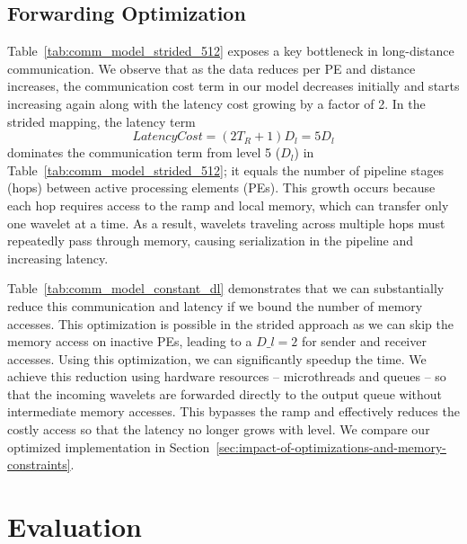 \documentclass[conference]{IEEEtran}
\begin{document}
        \subsection{Forwarding Optimization} \label{sec:forwarding}
            Table~\ref{tab:comm_model_strided_512} exposes a key bottleneck in long-distance communication.  We observe that as the data reduces per PE and distance increases, the communication cost term in our model decreases initially and starts increasing again along with the latency cost growing by a factor of 2.
            In the strided mapping, the latency term
            \begin{equation}\label{equation:latency}
                LatencyCost = (2T_R + 1)D_l = 5D_l
            \end{equation}
            dominates the communication term from level 5 (\(D_l\)) in Table~\ref{tab:comm_model_strided_512}; it equals the number of pipeline stages (hops) between active processing elements (PEs). This growth occurs because each hop requires access to the ramp and local memory, which can transfer only one wavelet at a time. As a result, wavelets traveling across multiple hops must repeatedly pass through memory, causing serialization in the pipeline and increasing latency.

            Table~\ref{tab:comm_model_constant_dl} demonstrates
            that we can substantially reduce this communication and latency
            if we bound the number of memory accesses.  This optimization is possible in the strided approach as we can skip the memory access on inactive PEs, leading to a \(D\_l = 2\) for sender and receiver accesses. Using this optimization, we can significantly speedup the time. We achieve this reduction using hardware resources -- microthreads and queues -- so that the incoming wavelets are forwarded directly to the output queue without intermediate memory accesses. This bypasses the ramp and effectively reduces the costly access so that the latency no longer grows with level. We compare our optimized implementation in Section~\ref{sec:impact-of-optimizations-and-memory-constraints}.



    \section{Evaluation}

\end{document}
